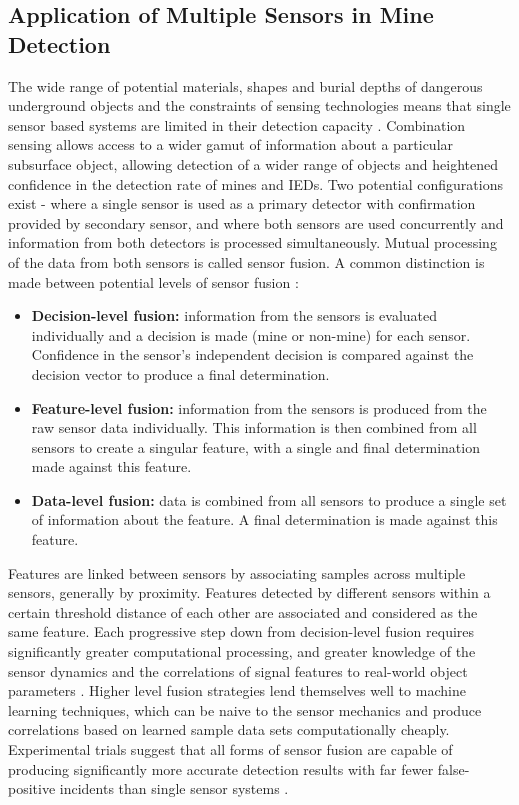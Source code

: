 \documentclass[main.tex]{subfiles}
\begin{document}
\subsection{Application of Multiple Sensors in Mine Detection}
The wide range of potential materials, shapes and burial depths of dangerous underground objects and the constraints of sensing technologies means that single sensor based systems are limited in their detection capacity \parencite{Yarovoy2009}. Combination sensing allows access to a wider gamut of information about a particular subsurface object, allowing detection of a wider range of objects and heightened confidence in the detection rate of mines and IEDs. Two potential configurations exist - where a single sensor is used as a primary detector with confirmation provided by secondary sensor, and where both sensors are used concurrently and information from both detectors is processed simultaneously. Mutual processing of the data from both sensors is called sensor fusion. A common distinction is made between potential levels of sensor fusion \parencite{Yarovoy2009}:
\begin{itemize}
\item \textbf{Decision-level fusion:} information from the sensors is evaluated individually and a decision is made (mine or non-mine) for each sensor. Confidence in the sensor's independent decision is compared against the decision vector to produce a final determination.
\item \textbf{Feature-level fusion:} information from the sensors is produced from the raw sensor data individually. This information is then combined from all sensors to create a singular feature, with a single and final determination made against this feature. 
\item \textbf{Data-level fusion:} data is combined from all sensors to produce a single set of information about the feature. A final determination is made against this feature.
\end{itemize}
Features are linked between sensors by associating samples across multiple sensors, generally by proximity. Features detected by different sensors within a certain threshold distance of each other are associated and considered as the same feature. Each progressive step down from decision-level fusion requires significantly greater computational processing, and greater knowledge of the sensor dynamics and the correlations of signal features to real-world object parameters \parencite{Yarovoy2009}. Higher level fusion strategies lend themselves well to machine learning techniques, which can be naive to the sensor mechanics and produce correlations based on learned sample data sets computationally cheaply. Experimental trials suggest that all forms of sensor fusion are capable of producing significantly more accurate detection results with far fewer false-positive incidents than single sensor systems \parencite{Yarovoy2009}.
\end{document}
